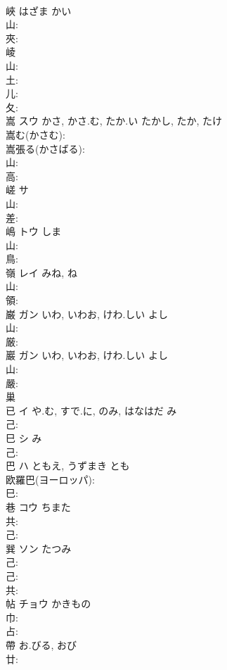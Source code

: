 \documentclass[8pt]{extreport}
\begin{document}
\begin{CJK}{UTF8}{min}
\\	峽		はざま	かい			
\\	山: 
\\	夾: 
\\	崚					
\\	山: 
\\	土: 
\\	儿: 
\\	夂: 
\\	嵩	スウ	かさ, かさ.む, たか.い	たかし, たか, たけ	
\\	嵩む(かさむ): 
\\	嵩張る(かさばる): 
\\	山: 
\\	高: 
\\	嵯	サ			
\\	山: 
\\	差: 
\\	嶋	トウ	しま		
\\	山: 
\\	鳥: 
\\	嶺	レイ		みね, ね	
\\	山: 
\\	領: 
\\	巌	ガン	いわ, いわお, けわ.しい	よし	
\\	山: 
\\	厳: 
\\	巖	ガン	いわ, いわお, けわ.しい	よし	
\\	山: 
\\	嚴: 
\\	巢						
\\	已	イ	や.む, すで.に, のみ, はなはだ	み	
\\	己: 
\\	巳	シ	み		
\\	己: 
\\	巴	ハ	ともえ, うずまき	とも	
\\	欧羅巴(ヨーロッパ): 
\\	巳: 
\\	巷	コウ	ちまた		
\\	共: 
\\	己: 
\\	巽	ソン	たつみ		
\\	己: 
\\	己: 
\\	共: 
\\	帖	チョウ	かきもの		
\\	巾: 
\\	占: 
\\	帶		お.びる, おび				
\\	廿: 

\end{CJK}
\end{document}
